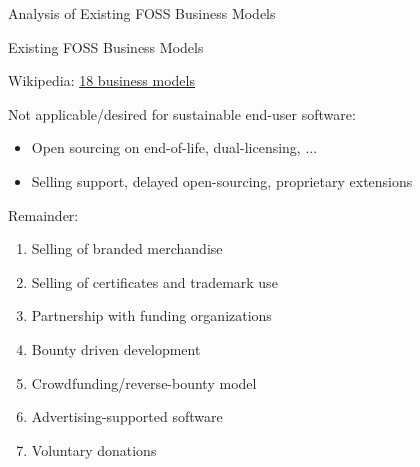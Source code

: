 \documentclass[t]{beamer}
\begin{document}

\begin{frame}[label=ol30]{}

\vspace{0.3\textheight}
\LARGE
\begin{center}
  Analysis of Existing FOSS Business Models
\end{center}

\end{frame}


\begin{frame}[label=obs3]{Existing FOSS Business Models}

Wikipedia: \href{https://en.wikipedia.org/wiki/Business_models_for_open-source_software}{18 business models}

\pause
\medskip
Not applicable/desired for sustainable end-user software:
\begin{itemize}
 \item Open sourcing on end-of-life,  dual-licensing, ...
 \pause
 \item Selling support,  delayed open-sourcing, proprietary extensions
\end{itemize}
\pause

Remainder:

\begin{enumerate}
\item Selling of branded merchandise
\item Selling of certificates and trademark use
\item Partnership with funding organizations
\item Bounty driven development
\item Crowdfunding/reverse-bounty model
\item Advertising-supported software
\item Voluntary donations
\end{enumerate}


\end{frame}

\end{document}
